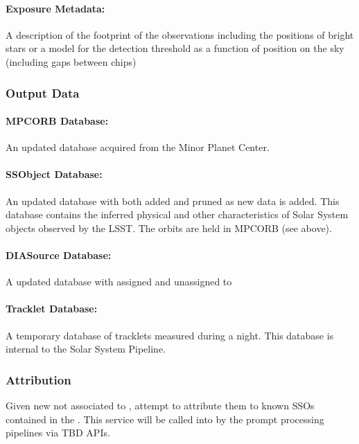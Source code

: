 \paragraph*{Exposure Metadata:} A description of the footprint of the observations including the positions of bright stars or a model for the detection threshold as a function of position on the sky (including gaps between chips)


\subsubsection{Output Data}

\paragraph*{MPCORB Database: } An updated \MPCORB database acquired from the Minor Planet Center.

\paragraph*{SSObject Database: } An updated \SSObject database with \SSObjects both added and pruned as new data is added. This database contains the inferred physical and other characteristics of Solar System objects observed by the LSST. The orbits are held in MPCORB (see above).

\paragraph*{DIASource Database:} A updated \DIASource database with \DIASources assigned and unassigned to \SSObjects

\paragraph*{Tracklet Database:} A temporary database of tracklets measured during a night. This database is internal to the Solar System Pipeline.



\subsubsection{Attribution}

Given new \DIASources not associated to \DIAObjects, attempt to attribute them to known SSOs contained in the \MPCORB. This service will be called into by the prompt processing pipelines via TBD APIs.

